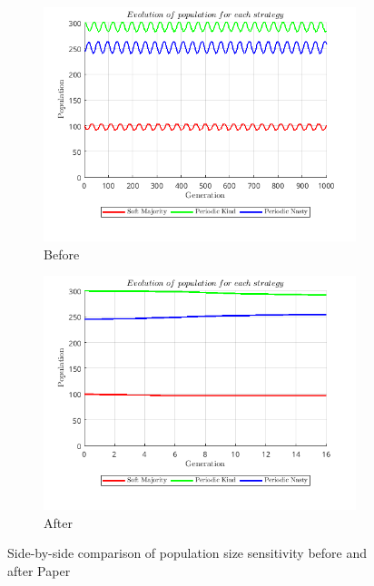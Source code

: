 \documentclass[12pt]{report}
\begin{document}
\begin{figure}[H]
    \centering
    \begin{subfigure}[t]{0.45\textwidth}
        \centering
        \includegraphics[width=\textwidth]{population_size_sensitivity_before_paper.png}
        \caption{Before}
    \end{subfigure}
    \hfill
    \begin{subfigure}[t]{0.45\textwidth}
        \centering
        \includegraphics[width=\textwidth]{population_size_sensitivity_after_paper.png}
        \caption{After}
    \end{subfigure}
    \caption{Side-by-side comparison of population size sensitivity before and after Paper}
\end{figure}
\end{document}

